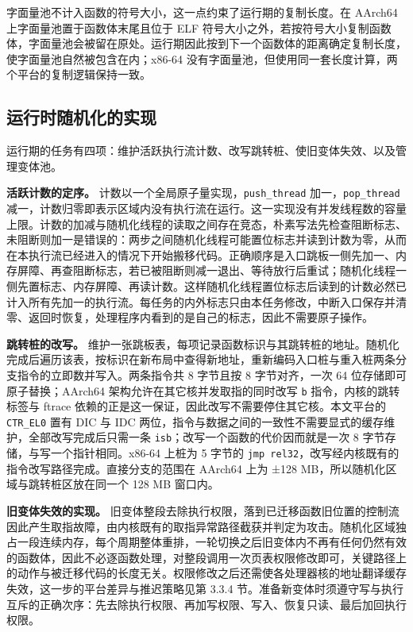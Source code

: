 字面量池不计入函数的符号大小，这一点约束了运行期的复制长度。在 AArch64 上字面量池置于函数体末尾且位于 ELF 符号大小之外，若按符号大小复制函数体，字面量池会被留在原处。运行期因此按到下一个函数体的距离确定复制长度，使字面量池自然被包含在内；x86-64 没有字面量池，但使用同一套长度计算，两个平台的复制逻辑保持一致。

\subsection{运行时随机化的实现}

运行期的任务有四项：维护活跃执行流计数、改写跳转桩、使旧变体失效、以及管理变体池。

\textbf{活跃计数的定序。} 计数以一个全局原子量实现，\lstinline[breaklines=false]@push_thread@ 加一，\lstinline[breaklines=false]@pop_thread@ 减一，计数归零即表示区域内没有执行流在运行。这一实现没有并发线程数的容量上限。计数的加减与随机化线程的读取之间存在竞态，朴素写法先检查阻断标志、未阻断则加一是错误的：两步之间随机化线程可能置位标志并读到计数为零，从而在本执行流已经进入的情况下开始搬移代码。正确顺序是入口跳板一侧先加一、内存屏障、再查阻断标志，若已被阻断则减一退出、等待放行后重试；随机化线程一侧先置标志、内存屏障、再读计数。这样随机化线程置位标志后读到的计数必然已计入所有先加一的执行流。每任务的内外标志只由本任务修改，中断入口保存并清零、返回时恢复，处理程序内看到的是自己的标志，因此不需要原子操作。

\textbf{跳转桩的改写。} 维护一张跳板表，每项记录函数标识与其跳转桩的地址。随机化完成后遍历该表，按标识在新布局中查得新地址，重新编码入口桩与重入桩两条分支指令的立即数并写入。两条指令共 8 字节且按 8 字节对齐，一次 64 位存储即可原子替换；AArch64 架构允许在其它核并发取指的同时改写 \lstinline[breaklines=false]@b@ 指令，内核的跳转标签与 ftrace 依赖的正是这一保证，因此改写不需要停住其它核。本文平台的 \lstinline[breaklines=false]@CTR_EL0@ 置有 DIC 与 IDC 两位，指令与数据之间的一致性不需要显式的缓存维护，全部改写完成后只需一条 \lstinline[breaklines=false]@isb@；改写一个函数的代价因而就是一次 8 字节存储，与写一个指针相同。x86-64 上桩为 5 字节的 \lstinline[breaklines=false]@jmp rel32@，改写经内核既有的指令改写路径完成。直接分支的范围在 AArch64 上为 ±128 MB，所以随机化区域与跳转桩区放在同一个 128 MB 窗口内。

\textbf{旧变体失效的实现。} 旧变体整段去除执行权限，落到已迁移函数旧位置的控制流因此产生取指故障，由内核既有的取指异常路径截获并判定为攻击。随机化区域独占一段连续内存，每个周期整体重排，一轮切换之后旧变体内不再有任何仍然有效的函数体，因此不必逐函数处理，对整段调用一次页表权限修改即可，关键路径上的动作与被迁移代码的长度无关。权限修改之后还需使各处理器核的地址翻译缓存失效，这一步的平台差异与推迟策略见第 3.3.4 节。准备新变体时须遵守写与执行互斥的正确次序：先去除执行权限、再加写权限、写入、恢复只读、最后加回执行权限。

